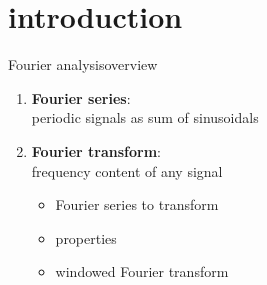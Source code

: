 



\subtitle{Part 7: Fourier Series}


	

\section{introduction}
        \begin{frame}{Fourier analysis}{overview}
            \begin{enumerate}
                \item   \textbf{Fourier series}:\\ periodic signals as sum of sinusoidals
                \bigskip
                \item   \textbf{Fourier transform}:\\ frequency content of any signal
                    \begin{itemize}
                        \item   Fourier series to transform
                        \item   properties
                        \item   windowed Fourier transform
                    \end{itemize}
            \end{enumerate}
        \end{frame}

